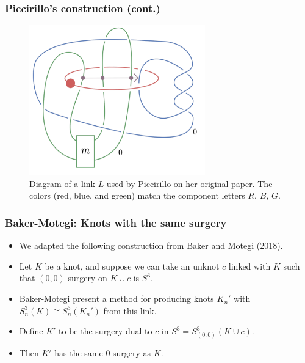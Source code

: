 \documentclass{beamer}
\theoremstyle{ex}
\theoremstyle{rem}
\begin{document}
\begin{frame}
	\frametitle{Piccirillo's construction (cont.)}
	\begin{figure}
		\begin{center}
			\includegraphics[width=3in]{picci.png}
			\caption{Diagram of a link $L$ used by Piccirillo on her original paper. The colors (red, blue, and green) match the component letters $R$, $B$, $G$.}
		\end{center}
	\end{figure}
\end{frame}


	\begin{frame}
		\frametitle{Baker-Motegi: Knots with the same surgery}
			\begin{itemize}
				\item We adapted the following construction from Baker and Motegi (2018).
				
				\item Let $K$ be a knot, and suppose we can take an unknot $c$ linked with $K$ such that $(0,0)$-surgery on $K\cup c$ is $S^3$.
				
				\item Baker-Motegi present a method for producing knots $K_n'$ with $S^3_n(K)\cong S^3_n(K_n')$ from this link.
				
				\item Define $K'$ to be the surgery dual to $c$ in $S^3=S^3_{(0,0)}(K\cup c)$.
				
				\item Then $K'$ has the same 0-surgery as $K$.
				
			\end{itemize}
		
			
	
	\end{frame}
\end{document}
